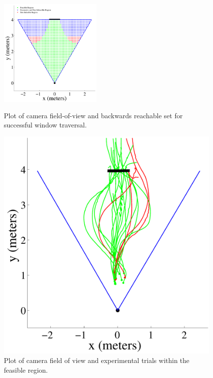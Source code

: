 \documentclass{aamas2013}
\begin{document}
\begin{figure}[tb]

\begin{minipage}{\linewidth}
\centering
\includegraphics[width=0.45\textwidth]{figures/feasible_set.pdf}
\caption{Plot of camera field-of-view and backwards reachable set for successful window traversal.}
\label{fig:feasible_set}
\end{minipage}
\vspace{1em}
\begin{minipage}[b]{0.45\linewidth}
\centering
\includegraphics[width=\textwidth]{figures/flight_paths_feasible.pdf}
\caption{Plot of camera field of view and experimental trials within the feasible region.}

\end{minipage}
\end{figure}
\end{document}
